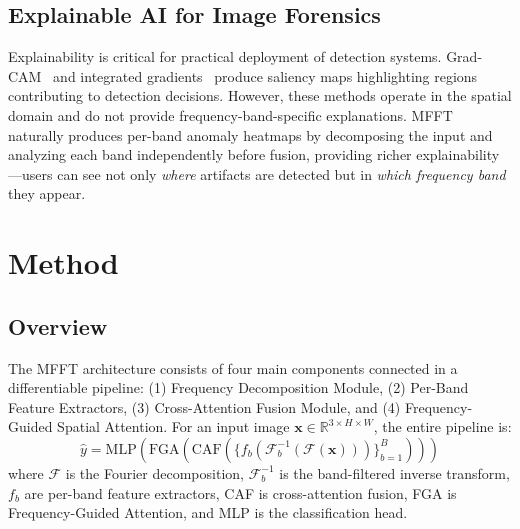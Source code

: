 \documentclass[journal]{IEEEtran}
\begin{document}
\subsection{Explainable AI for Image Forensics}
Explainability is critical for practical deployment of detection systems. Grad-CAM~\cite{selvaraju2017} and integrated gradients~\cite{sundararajan2017} produce saliency maps highlighting regions contributing to detection decisions. However, these methods operate in the spatial domain and do not provide frequency-band-specific explanations. MFFT naturally produces per-band anomaly heatmaps by decomposing the input and analyzing each band independently before fusion, providing richer explainability---users can see not only \emph{where} artifacts are detected but in \emph{which frequency band} they appear.

\section{Method}

\subsection{Overview}
The MFFT architecture consists of four main components connected in a differentiable pipeline: (1) Frequency Decomposition Module, (2) Per-Band Feature Extractors, (3) Cross-Attention Fusion Module, and (4) Frequency-Guided Spatial Attention. For an input image $\mathbf{x} \in \mathbb{R}^{3 \times H \times W}$, the entire pipeline is:
\begin{equation}
\hat{y} = \text{MLP}(\text{FGA}(\text{CAF}(\{f_b(\mathcal{F}_b^{-1}(\mathcal{F}(\mathbf{x})))\}_{b=1}^B)))
\label{eq:pipeline}
\end{equation}
where $\mathcal{F}$ is the Fourier decomposition, $\mathcal{F}_b^{-1}$ is the band-filtered inverse transform, $f_b$ are per-band feature extractors, CAF is cross-attention fusion, FGA is Frequency-Guided Attention, and MLP is the classification head.
\end{document}
